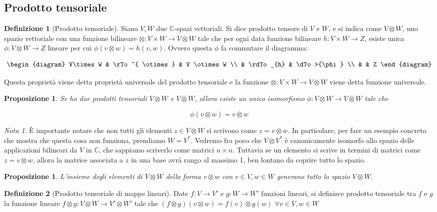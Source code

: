 \documentclass[11pt]{article}
\theoremstyle{plain}
\newtheorem{prop}[thm]{Proposizione}
\theoremstyle{definition}
\newtheorem{defn}{Definizione}[section]
\theoremstyle{remark}
\newtheorem*{note}{Nota}
\newcommand{\C}{\mathbb{C}}
\newcommand{\tridiag}[6]{
	\[
	  \begin{diagram}
	  #1 & \rTo^{#2}  & #3        \\
	     & \rdTo_{#6} & \dTo>{#4}   \\
	     &          & #5
	  \end{diagram}
	\]
}
\begin{document}
\subsection{Prodotto tensoriale}

\begin{defn}[Prodotto tensoriale]
   Siano $V, W$ due $\mathbb{C}$-spazi vettoriali. Si dice prodotto tensore di $V$ e $W$, 
   e si indica come $V\otimes W$, uno spazio vettoriale con una funzione bilineare 
   $\otimes: V \times W \to V\otimes W$ tale che per ogni data funzione bilineare $h: V\times W \to  Z$,
   esiste unica $\phi: V\otimes W \to Z$ lineare per cui $\phi(v \otimes w)=h(v,w)$. Ovvero questa $\phi$ fa commutare il diagramma:
   \tridiag{V\times W}{ \otimes }{V \otimes W}{\phi}{Z}{h}
   Questa proprietà viene detta proprietà universale del prodotto tensoriale e la funzione $\otimes: V \times W \to V\otimes W$
   viene detta funzione universale.
\label{defn:prodotto tensoriale}
\end{defn}


\begin{prop}
Se ho due prodotti tensoriali $V \otimes W$ e $V \overline{\otimes} W$, allora esiste un unico isomorfismo 
$\phi: V \otimes W \to V \overline{\otimes} W$ tale che

\[ \phi (v\otimes w) = v \overline{\otimes} w\]
\end{prop}


\begin{note}
\`E importante notare che non tutti gli elementi $z \in V \otimes W$ si scrivono come $z = v \otimes w$. In particolare, per fare un esempio concreto che mostra che questa cosa non funziona, prendiamo $W = V^*$. Vedremo fra poco che $V\otimes V^*$ è canonicamente isomorfo allo spazio delle applicazioni bilineari da $V$ in $\C$, che sappiamo scriverlo come matrici $n\times n$. Tuttavia se un elemento si scrive in termini di matrici come $z = v\otimes w$, allora la matrice associata a $z$ in una base avrà rango al massimo 1, ben lontano da coprire tutto lo spazio.
\end{note}


\begin{prop}
L'insieme degli elementi di $V\otimes W$ della forma $v\otimes w$ con $v\in V, w\in W$ generano tutto lo spazio $V\otimes W$.
\end{prop}


\begin{defn}[Prodotto tensoriale di mappe lineari]
Date $f:V \to V'$ e $g:W \to W'$ funzioni lineari, si definisce prodotto tensoriale tra $f$ e $g$ la funzione lineare $f \otimes g : V \otimes W \to V' \otimes W'$ tale che $(f \otimes g)(v \otimes w)=f(v) \otimes g(w)$ $\forall v\in V, w\in W$

\end{defn}
\end{document}
